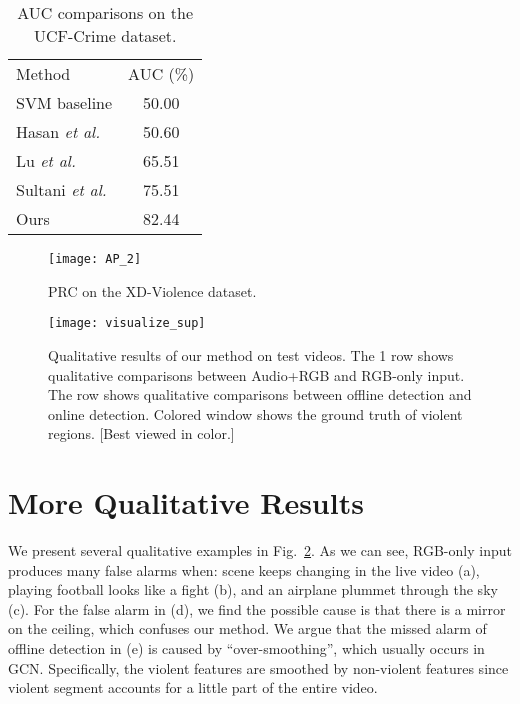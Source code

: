 \documentclass[runningheads]{llncs}
\begin{document}
\setlength{\tabcolsep}{4pt}
\begin{table}[t]
\begin{center}
\caption{ AUC comparisons on the UCF-Crime dataset.}
\label{table:UCF}
\begin{tabular}{lc}
\hline\noalign{\smallskip}
Method  &  AUC (\%)  \\
\noalign{\smallskip}
\hline
\noalign{\smallskip}
SVM baseline   & 50.00 \\
Hasan \textit{et al.} \cite{hasan2016learning}   & 50.60 \\
Lu \textit{et al.} \cite{lu2013abnormal}  & 65.51 \\
Sultani \textit{et al.} \cite{sultani2018real}   & 75.51 \\
Ours   & 82.44 \\
\hline
\end{tabular}
\end{center}
\end{table}

\begin{figure}[h]
\centering
\texttt{[image: AP\_2]}
\caption{PRC on the XD-Violence dataset.}
\label{fig:AP}
\end{figure}



\begin{figure}[!tbph]
\centering
\texttt{[image: visualize\_sup]}
\caption{Qualitative results of our method on test videos. The 1 row shows qualitative comparisons between Audio+RGB and RGB-only input. The  row shows qualitative comparisons between offline detection and online detection. Colored window shows the ground truth of violent regions. [Best viewed in color.]}
\label{fig:visualize_sup}
\end{figure}


\section{More Qualitative Results}
We present several qualitative examples in Fig.~\ref{fig:visualize_sup}. As we can see, RGB-only input produces many false alarms when: scene keeps changing in the live video (a), playing football looks like a fight (b), and an airplane plummet through the sky (c). For the false alarm in (d), we find the possible cause is that there is a mirror on the ceiling, which confuses our method. We argue that the missed alarm of offline detection in (e) is caused by “over-smoothing”, which usually occurs in GCN. Specifically, the violent features are smoothed by non-violent features since violent segment accounts for a little part of the entire video.
\end{document}

